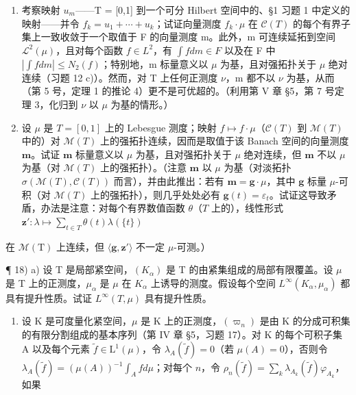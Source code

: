 \begin{enumerate}
\def\labelenumi{\arabic{enumi})}
\setcounter{enumi}{15}
\item
  考察映射 \(u_{m}\)——T = {[}0,1{]} 到一个可分 Hilbert 空间中的、§1 习题 1 中定义的映射——并令 \(f_{k} = u_{1} + \cdots + u_{k}\)；试证向量测度 \(f_{k} \cdot \mu\) 在 \(\mathcal{C}(T)\) 的每个有界子集上一致收敛于一个取值于 F 的向量测度 m。此外，m 可连续延拓到空间 \(\mathcal{L}^{2}(\mu)\)，且对每个函数 \(f \in L^{2}\)，有 \(\int f dm \in F\) 以及在 F 中 \(|\int f dm| \leqslant N_{2}(f)\)；特别地，m 标量意义以 \(\mu\) 为基，且对强拓扑关于 \(\mu\) 绝对连续（习题 12 c)）。然而，对 T 上任何正测度 \(\nu\)，m 都不以 \(\nu\) 为基，从而（第 5 号，定理 1 的推论 4）更不是可优超的。（利用第 V 章 §5，第 7 号定理 3，化归到 \(\nu\) 以 \(\mu\) 为基的情形。）
\item
    设 \(\mu\) 是 \(T = [0,1]\) 上的 Lebesgue 测度；映射 \(f \mapsto f \cdot \mu\)（\(\mathcal{C}(T)\) 到 \(\mathcal{M}(T)\) 中的）对 \(\mathcal{M}(T)\) 上的强拓扑连续，因而是取值于该 Banach 空间的向量测度 \(\mathbf{m}\)。试证 \(\mathbf{m}\) 标量意义以 \(\mu\) 为基，且对强拓扑关于 \(\mu\) 绝对连续，但 \(\mathbf{m}\) 不以 \(\mu\) 为基（对 \(\mathcal{M}(T)\) 上的强拓扑）。（注意 \(\mathbf{m}\) 以 \(\mu\) 为基（对淡拓扑 \(\sigma(\mathcal{M}(T), \mathcal{C}(T))\) 而言），并由此推出：若有 \(\mathbf{m} = \mathbf{g} \cdot \mu\)，其中 \(\mathbf{g}\) 标量 \(\mu\)-可积（对 \(\mathcal{M}(T)\) 上的强拓扑），则几乎处处必有 \(\mathbf{g}(t) = \varepsilon_t\)。试证这导致矛盾，办法是注意：对每个有界数值函数 \(\theta\)（\(T\) 上的），线性形式 \(\mathbf{z}' : \lambda \mapsto \sum_{t \in T} \theta(t) \lambda(\{t\})\)
\end{enumerate}

在 \(\mathcal{M}(\mathrm{T})\) 上连续，但 \(\langle \mathbf{g},\mathbf{z}'\rangle\) 不一定 \(\mu\)-可测。）

¶ 18) a) 设 T 是局部紧空间，\((K_{\alpha})\) 是 T 的由紧集组成的局部有限覆盖。设 \(\mu\) 是 T 上的正测度，\(\mu_{\alpha}\) 是 \(\mu\) 在 \(K_{\alpha}\) 上诱导的测度。假设每个空间 \(L^{\infty}(K_{\alpha}, \mu_{\alpha})\) 都具有提升性质。试证 \(L^{\infty}(T, \mu)\) 具有提升性质。

\begin{enumerate}
\def\labelenumi{\alph{enumi})}
\setcounter{enumi}{1}
\tightlist
\item
  设 K 是可度量化紧空间，\(\mu\) 是 K 上的正测度，\((\varpi_n)\) 是由 K 的分成可积集的有限分割组成的基本序列（第 IV 章 §5，习题 17）。对 K 的每个可积子集 A 以及每个元素 \(\widetilde{f} \in \mathrm{L}^1(\mu)\)，令 \(\lambda_A(\widetilde{f}) = 0\)（若 \(\mu(A) = 0\)），否则令 \(\lambda_A(\widetilde{f}) = (\mu(A))^{-1} \int_{A} f d\mu\)；对每个 \(n\)，令 \(\rho_n(\widetilde{f}) = \sum_k \lambda_{A_k}(\widetilde{f}) \varphi_{A_k}\)，如果
\end{enumerate}

